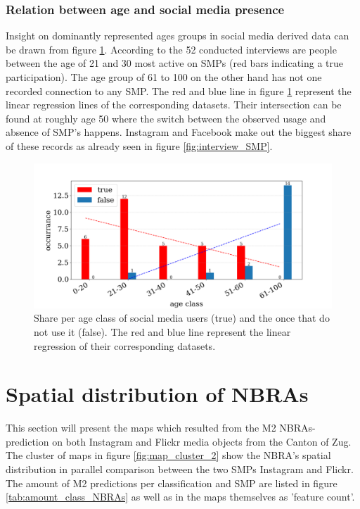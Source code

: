 \subsubsection{Relation between age and social media presence}
Insight on dominantly represented ages groups in social media derived data can be drawn from figure \ref{fig:interview_age_SMP}. According to the 52 conducted interviews are people between the age of 21 and 30 most active on SMPs (red bars indicating a true participation). The age group of 61 to 100 on the other hand has not one recorded connection to any SMP. The red and blue line in figure \ref{fig:interview_age_SMP} represent the linear regression lines of the corresponding datasets. Their intersection can be found at roughly age 50 where the switch between the observed usage and absence of SMP's happens. Instagram and Facebook make out the biggest share of these records as already seen in figure \ref{fig:interview_SMP}. 
\begin{figure}[h!]
   \centering
   \includegraphics[width=\textwidth]{img/interview_socialmedia_age_bigger_font.pdf}
   \caption{Share per age class of social media users (true) and the once that do not use it (false). The red and blue line represent the linear regression of their corresponding datasets.}
   \label{fig:interview_age_SMP}
\end{figure}

\section{Spatial distribution of NBRAs}
This section will present the maps which resulted from the M2 NBRAs- prediction on both Instagram and Flickr media objects from the Canton of Zug. The cluster of maps in figure \ref{fig:map_cluster_2} show the NBRA's spatial distribution in parallel comparison between the two SMPs Instagram and Flickr. The amount of M2 predictions per classification and SMP are listed in figure \ref{tab:amount_class_NBRAs} as well as in the maps themselves as 'feature count'.

